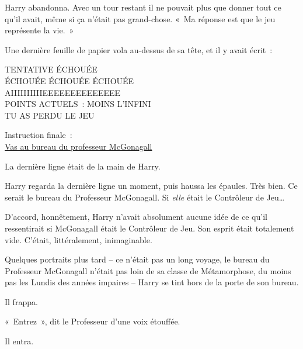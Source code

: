 Harry abandonna. Avec un tour restant il ne pouvait plus que donner tout ce qu'il avait, même si ça n'était pas grand-chose. «~Ma réponse est que le jeu représente la vie.~»

Une dernière feuille de papier vola au-dessus de sa tête, et il y avait écrit~:

\begin{writtenNote}\centering
\begin{center}\scshape
TENTATIVE ÉCHOUÉE\\
ÉCHOUÉE ÉCHOUÉE ÉCHOUÉE\\
AIIIIIIIIIIEEEEEEEEEEEEEE\\
POINTS ACTUELS~: MOINS L'INFINI\\
\MakeUppercase{TU AS PERDU LE JEU}

Instruction finale~:\\
\underline{Vas au bureau du professeur McGonagall}
\end{center}
\end{writtenNote}

La dernière ligne était de la main de Harry.

Harry regarda la dernière ligne un moment, puis haussa les épaules. Très bien. Ce serait le bureau du Professeur McGonagall. Si \emph{elle} était le Contrôleur de Jeu…

D'accord, honnêtement, Harry n'avait absolument aucune idée de ce qu'il ressentirait si McGonagall était le Contrôleur de Jeu. Son esprit était totalement vide. C'était, littéralement, inimaginable.

Quelques portraits plus tard -- ce n'était pas un long voyage, le bureau du Professeur McGonagall n'était pas loin de sa classe de Métamorphose, du moins pas les Lundis des années impaires -- Harry se tint hors de la porte de son bureau.

Il frappa.

«~Entrez~», dit le Professeur d'une voix étouffée.

Il entra.


